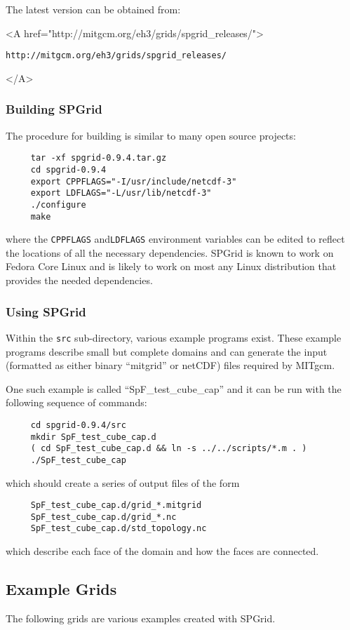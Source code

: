 The latest version can be obtained from:
\begin{center}
  \begin{rawhtml}
     <A href="http://mitgcm.org/eh3/grids/spgrid_releases/">
  \end{rawhtml}
  \texttt{http://mitgcm.org/eh3/grids/spgrid\_releases/}
  \begin{rawhtml} </A> \end{rawhtml}
\end{center}


\subsubsection{Building SPGrid}

The procedure for building is similar to many open source projects:
\begin{verbatim}
     tar -xf spgrid-0.9.4.tar.gz
     cd spgrid-0.9.4
     export CPPFLAGS="-I/usr/include/netcdf-3"
     export LDFLAGS="-L/usr/lib/netcdf-3"
     ./configure
     make
\end{verbatim}
where the \texttt{CPPFLAGS} and\texttt{LDFLAGS} environment variables
can be edited to reflect the locations of all the necessary
dependencies.  SPGrid is known to work on Fedora Core Linux and is
likely to work on most any Linux distribution that provides the needed
dependencies.


\subsubsection{Using SPGrid}

Within the \texttt{src} sub-directory, various example programs
exist.  These example programs describe small but complete domains and
can generate the input (formatted as either binary ``mitgrid'' or
netCDF) files required by MITgcm.

One such example is called ``SpF\_test\_cube\_cap'' and it can be run
with the following sequence of commands:
\begin{verbatim}
     cd spgrid-0.9.4/src
     mkdir SpF_test_cube_cap.d
     ( cd SpF_test_cube_cap.d && ln -s ../../scripts/*.m . )
     ./SpF_test_cube_cap
\end{verbatim}
which should create a series of output files of the form
\begin{verbatim}
     SpF_test_cube_cap.d/grid_*.mitgrid
     SpF_test_cube_cap.d/grid_*.nc
     SpF_test_cube_cap.d/std_topology.nc
\end{verbatim}
which describe each face of the domain and how the faces are
connected.


\subsection{Example Grids}

The following grids are various examples created with SPGrid. 

